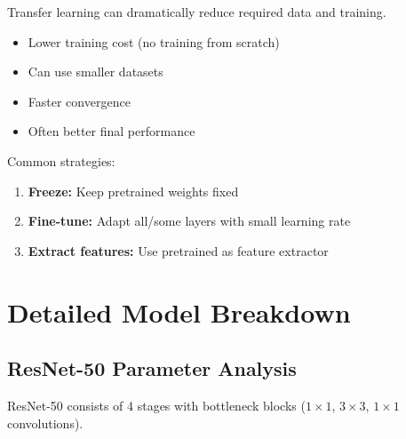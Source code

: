 Transfer learning can dramatically reduce required data and training.

\begin{properties}
\begin{itemize}
    \item Lower training cost (no training from scratch)
    \item Can use smaller datasets
    \item Faster convergence
    \item Often better final performance
\end{itemize}
\end{properties}

Common strategies:
\begin{enumerate}
    \item \textbf{Freeze:} Keep pretrained weights fixed
    \item \textbf{Fine-tune:} Adapt all/some layers with small learning rate
    \item \textbf{Extract features:} Use pretrained as feature extractor
\end{enumerate}

\section{Detailed Model Breakdown}

\subsection{ResNet-50 Parameter Analysis}

ResNet-50 \cite{he2016deep} consists of 4 stages with bottleneck blocks ($1 \times 1$, $3 \times 3$, $1 \times 1$ convolutions).

